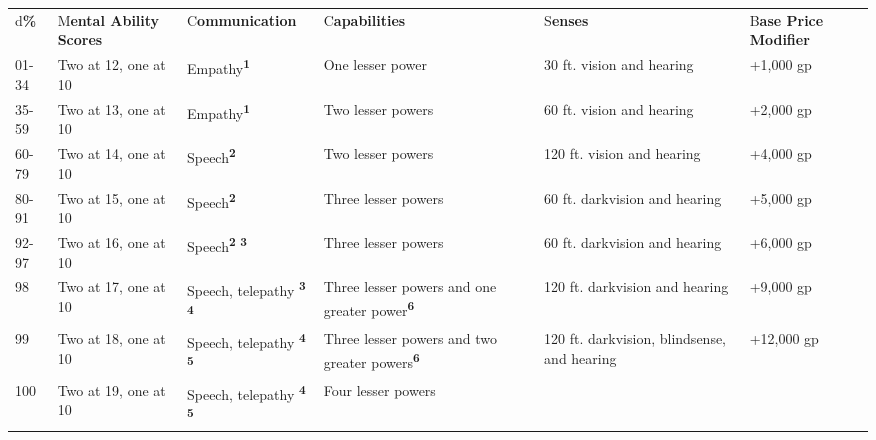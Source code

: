 \documentclass{article}
\begin{document}
\vspace{12pt}
\begin{tabular}{|>{\raggedright}p{18pt}|>{\raggedright}p{37pt}|>{\raggedright}p{51pt}|>{\raggedright}p{66pt}|>{\raggedright}p{72pt}|>{\raggedright}p{32pt}|}
\hline
\multicolumn{6}{|p{278pt}|}{T\textbf{able: Item Intelligence, Wisdom, Charisma, 
and Capabilities}}\tabularnewline
\hline
d\textbf{\%} & M\textbf{ental Ability Scores} & C\textbf{ommunication} & C\textbf{apabilities} & S\textbf{enses} & B\textbf{ase 
Price Modifier}\tabularnewline
\hline
01-34 & Two at 12,\linebreak{}
one at 10 & Empathy\textsuperscript{\textbf{1}} & One lesser power & 30 ft. vision 
and hearing & +1,000 gp\tabularnewline
\hline
35-59 & Two at 13,\linebreak{}
one at 10 & Empathy\textsuperscript{\textbf{1}} & Two lesser powers & 60 ft. vision 
and hearing & +2,000 gp\tabularnewline
\hline
60-79 & Two at 14,\linebreak{}
one at 10 & Speech\textsuperscript{\textbf{2}} & Two lesser powers & 120 ft. vision 
and hearing & +4,000 gp\tabularnewline
\hline
80-91 & Two at 15,\linebreak{}
one at 10 & Speech\textsuperscript{\textbf{2}} & Three lesser powers & 60 ft. darkvision 
\linebreak{}
and hearing & +5,000 gp\tabularnewline
\hline
92-97 & Two at 16,\linebreak{}
one at 10 & Speech\textsuperscript{\textbf{2 3}} & Three lesser powers & 60 ft. 
darkvision \linebreak{}
and hearing & +6,000 gp\tabularnewline
\hline
98 & Two at 17,\linebreak{}
one at 10 & Speech, telepathy\textsuperscript{ }\textsuperscript{\textbf{3 4}} & Three 
lesser powers \linebreak{}
and one greater power\textsuperscript{\textbf{6}} & 120 ft. darkvision \linebreak{}
and hearing & +9,000 gp\tabularnewline
\hline
99 & Two at 18,\linebreak{}
one at 10 & Speech, telepathy\textsuperscript{ }\textsuperscript{\textbf{4 5}} & Three 
lesser powers \linebreak{}
and two greater powers\textsuperscript{\textbf{6}} & 120 ft. darkvision, blindsense, 
and hearing & +12,000 gp\tabularnewline
\hline
100 & Two at 19,\linebreak{}
one at 10 & Speech, telepathy \textsuperscript{\textbf{4 5}} & Four lesser powers 
\linebreak{}

\end{tabular}
\end{document}
